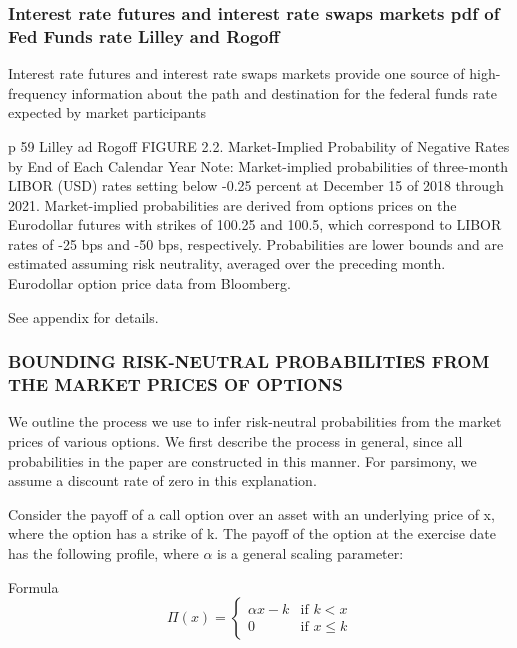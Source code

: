 \documentclass{beamer}
\begin{document}
\begin{frame}
\frametitle{Interest rate futures and interest rate swaps markets pdf of Fed Funds rate Lilley and Rogoff}
Interest rate futures and interest rate swaps markets provide one source of high-frequency information about the path and destination for the federal funds rate expected by market participants 

p 59 Lilley ad Rogoff FIGURE 2.2. Market-Implied Probability of Negative Rates by End of Each Calendar Year
Note: Market-implied probabilities of three-month LIBOR (USD) rates setting below -0.25 percent at December 15 of 2018 through 2021. Market-implied probabilities are derived from options prices on the Eurodollar futures with strikes of 100.25 and 100.5, which
correspond to LIBOR rates of -25 bps and -50 bps, respectively. Probabilities are lower bounds and are estimated assuming risk neutrality, averaged over the preceding month. Eurodollar option price data from Bloomberg. 

See appendix for details.
\end{frame}

\begin{frame}
\frametitle{BOUNDING RISK-NEUTRAL PROBABILITIES FROM THE MARKET PRICES OF OPTIONS}
We outline the process we use to infer risk-neutral probabilities
from the market prices of various options. We first describe the
process in general, since all probabilities in the paper are constructed in this manner. For parsimony, we assume a discount rate of zero in this explanation.

Consider the payoff of a call option over an asset with an underlying price of x, where the option has a strike of k. The payoff of the option at the exercise date has the following profile, where $\alpha$ is a general scaling parameter:

\begin{block}{Formula}
    \begin{equation}
    \Pi(x)=
    \begin{cases}
      \alpha x-k  & \text{if $k<x$}\\
      0 & \text{if $x \leq k$}
    \end{cases}
    \end{equation}
\end{block}
\end{frame}
\end{document}
